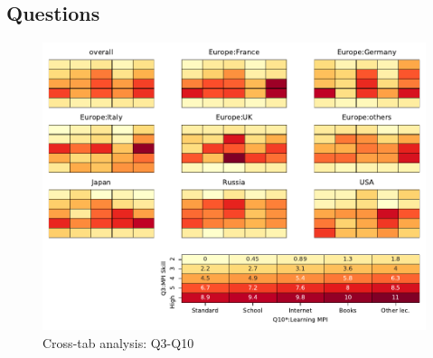 
\subsection{Questions}


\begin{figure}
\begin{center}
\includegraphics[width=12cm]{../pdfs/Q3-Q10.pdf}
\caption{Cross-tab analysis: Q3-Q10}
\label{fig:Q3-Q10}
\end{center}
\end{figure}
